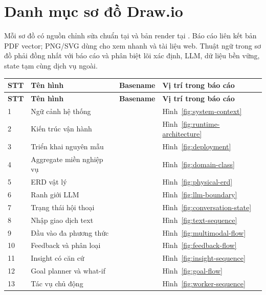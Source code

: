 \appendix

\chapter{Danh mục sơ đồ Draw.io}

Mỗi sơ đồ có nguồn chỉnh sửa chuẩn tại  và bản render tại . Báo cáo liên kết bản PDF vector; PNG/SVG dùng cho xem nhanh và tài liệu web. Thuật ngữ trong sơ đồ phải đồng nhất với báo cáo và phân biệt lõi xác định, LLM, dữ liệu bền vững, state tạm cùng dịch vụ ngoài.

\begin{longtable}{@{}C{1.0cm}L{4.2cm}L{4.5cm}L{3.0cm}@{}}
  \toprule
  \textbf{STT} & \textbf{Tên hình} & \textbf{Basename} & \textbf{Vị trí trong báo cáo} \\
  \midrule
  \endfirsthead
  \toprule
  \textbf{STT} & \textbf{Tên hình} & \textbf{Basename} & \textbf{Vị trí trong báo cáo} \\
  \midrule
   & Ngữ cảnh hệ thống &  & Hình~\ref{fig:system-context} \\
  2 & Kiến trúc vận hành &  & Hình~\ref{fig:runtime-architecture} \\
  3 & Triển khai nguyên mẫu &  & Hình~\ref{fig:deployment} \\
  4 & Aggregate miền nghiệp vụ &  & Hình~\ref{fig:domain-class} \\
  5 & ERD vật lý &  & Hình~\ref{fig:physical-erd} \\
  6 & Ranh giới LLM &  & Hình~\ref{fig:llm-boundary} \\
  7 & Trạng thái hội thoại &  & Hình~\ref{fig:conversation-state} \\
  8 & Nhập giao dịch text &  & Hình~\ref{fig:text-sequence} \\
  9 & Đầu vào đa phương thức &  & Hình~\ref{fig:multimodal-flow} \\
  10 & Feedback và phân loại &  & Hình~\ref{fig:feedback-flow} \\
  11 & Insight có căn cứ &  & Hình~\ref{fig:insight-sequence} \\
  12 & Goal planner và what-if &  & Hình~\ref{fig:goal-flow} \\
  13 & Tác vụ chủ động &  & Hình~\ref{fig:worker-sequence} \\
  \bottomrule
\end{longtable}

